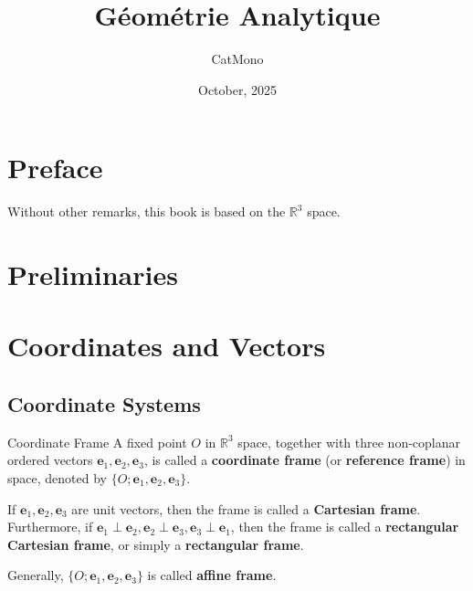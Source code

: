 \documentclass[11pt]{../../TexTemplate/elegantbook} %
\title{Géométrie Analytique} %
\author{CatMono} %
\date{October, 2025} %
\begin{document}
\maketitle %

\frontmatter        %
\tableofcontents    %

\chapter{Preface}   %
Without other remarks, this book is based on the \(\mathbb{R}^{3}\) space.

\mainmatter         %

\chapter{Preliminaries} %

\chapter{Coordinates and Vectors}
\section{Coordinate Systems}
\begin{definition}{Coordinate Frame}
    A fixed point \(O\) in \(\mathbb{R}^{3}\) space,
    together with three non-coplanar ordered vectors \(\mathbf{e}_{1}, \mathbf{e}_{2}, \mathbf{e}_{3}\),
    is called a \textbf{coordinate frame} (or \textbf{reference frame}) in space,
    denoted by \(\{O ; \mathbf{e}_{1}, \mathbf{e}_{2}, \mathbf{e}_{3}\}\).

    If \(\mathbf{e}_{1}, \mathbf{e}_{2}, \mathbf{e}_{3}\) are unit vectors,
    then the frame is called a \textbf{Cartesian frame}.
    Furthermore, if \(\mathbf{e}_{1} \perp \mathbf{e}_{2}, \mathbf{e}_{2} \perp \mathbf{e}_{3}, \mathbf{e}_{3} \perp \mathbf{e}_{1}\),
    then the frame is called a \textbf{rectangular Cartesian frame}, or simply a \textbf{rectangular frame}.

    Generally, \(\{O ; \mathbf{e}_{1}, \mathbf{e}_{2}, \mathbf{e}_{3}\}\) is called \textbf{affine frame}.
\end{definition}
\end{document}

